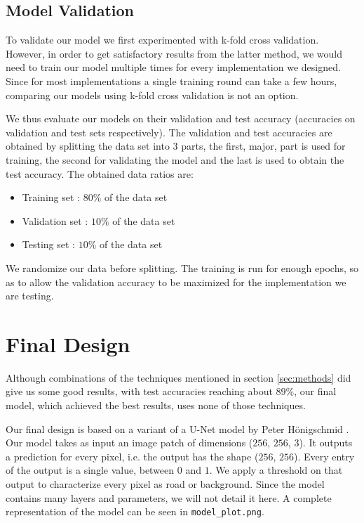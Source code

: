 \documentclass[10pt,conference,compsocconf]{IEEEtran}
\begin{document}
\subsection{Model Validation} 
\label{ssec:model_validation}

To validate our model we first experimented with k-fold cross validation. However, in order to get satisfactory results from the latter method, we would need to train our model multiple times for every implementation we designed. Since for most implementations a single training round can take a few hours, comparing our models using k-fold cross validation is not an option.

We thus evaluate our models on their validation and test accuracy (accuracies on validation and test sets respectively). The validation and test accuracies are obtained by splitting the data set into 3 parts, the first, major, part is used for training, the second for validating the model and the last is used to obtain the test accuracy. The obtained data ratios are: 
\begin{itemize}
	\item Training set : $80\%$ of the data set
	\item Validation set : $10\%$ of the data set
	\item Testing set : $10\%$ of the data set
\end{itemize}
We randomize our data before splitting. The training is run for enough epochs, so as to allow the validation accuracy to be maximized for the implementation we are testing.

\section{Final Design}
\label{sec:final}
Although combinations of the techniques mentioned in section \ref{sec:methods} did give us some good results, with test accuracies reaching about $89\%$, our final model, which achieved the best results, uses none of those techniques.

Our final design is based on a variant of a U-Net model by Peter Hönigschmid \cite{unet}. Our model takes as input an image patch of dimensions ($256$, $256$, $3$). It outputs a prediction for every pixel, i.e. the output has the shape ($256$, $256$). Every entry of the output is a single value, between $0$ and $1$. We apply a threshold on that output to characterize every pixel as road or background. Since the model contains many layers and parameters, we will not detail it here. A complete representation of the model can be seen in \texttt{model\_plot.png}. 
\end{document}

